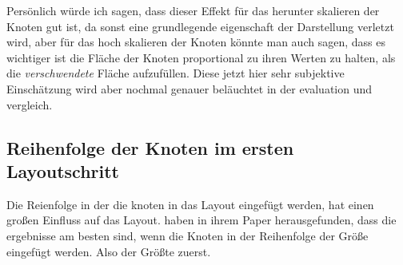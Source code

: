Persönlich würde ich sagen, dass dieser Effekt für das herunter skalieren der Knoten gut ist, da sonst eine grundlegende eigenschaft der Darstellung verletzt wird, aber für das hoch skalieren der Knoten könnte man auch sagen, dass es wichtiger ist die Fläche der Knoten proportional zu ihren Werten zu halten, als die \textit{verschwendete} Fläche aufzufüllen. Diese jetzt hier sehr subjektive Einschätzung wird aber nochmal genauer beläuchtet in der evaluation und vergleich.

\subsection{Reihenfolge der Knoten im ersten Layoutschritt} \label{sec:ReihenfolgeKnoten}
Die Reienfolge in der die knoten in das Layout eingefügt werden, hat einen großen Einfluss auf das Layout. \cite{johnson1991tree} haben in ihrem Paper herausgefunden, dass die ergebnisse am besten sind, wenn die Knoten in der Reihenfolge der Größe eingefügt werden. Also der Größte zuerst.

